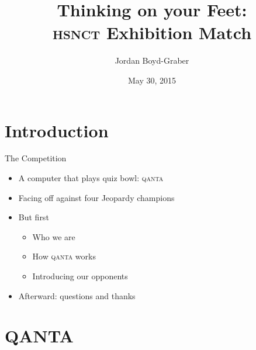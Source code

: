\documentclass[compress]{beamer}
\title[Thinking on Your Feet]{Thinking on your Feet: \\ \textsc{hsnct} Exhibition Match}
\author{ Jordan Boyd-Graber}
\date{May 30, 2015}
\institute[Boulder] %
{University of Colorado Boulder}
\begin{document}
\frame{
\titlepage
\tiny
}

\section{Introduction}

\begin{frame}{The Competition}

\begin{itemize}
	\item A computer that plays quiz bowl: \textsc{qanta}
	\item Facing off against four Jeopardy champions
	\pause
	\item But first
	\begin{itemize}
		\item Who we are
		\item How \textsc{qanta} works
		\item Introducing our opponents
	\end{itemize}
	\pause
	\item Afterward: questions and thanks
\end{itemize}

\end{frame}

\section{QANTA}
\end{document}
